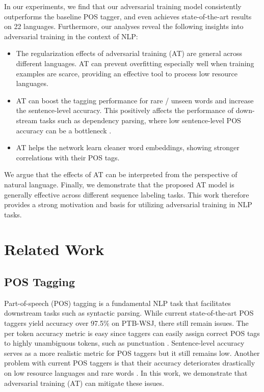 \documentclass[11pt,a4paper]{article}
\begin{document}
In our experiments, we find that our adversarial training model consistently
outperforms the baseline POS tagger, and even achieves state-of-the-art results on 22 languages.
Furthermore,
our analyses reveal the following 
insights into adversarial training in the context of NLP: \vspace{-1mm}

\begin{itemize}[topsep=2mm]
\setlength{\leftskip}{-3mm}
\setlength{\parskip}{0mm}
    \item The regularization effects of  adversarial training (AT) are general across different languages. AT can prevent overfitting especially well when training examples are scarce, providing an effective tool to process low resource languages.

    \item AT can boost the tagging performance for rare \!/\! unseen words and increase the sentence-level accuracy. This positively affects the performance of down-stream tasks such as dependency parsing, where low sentence-level POS accuracy can be a bottleneck \cite{Manning:2011:from97to100}.
    
    \item AT helps the network learn cleaner word embeddings, showing stronger correlations with their POS tags. \vspace{-1mm} 
\end{itemize}
We argue that the effects of AT can be interpreted from the perspective of natural language.
Finally, we demonstrate that the proposed AT model is generally effective across different sequence labeling tasks.
This work therefore provides a strong motivation and basis for utilizing adversarial training in
NLP 
tasks.








\section{Related Work}
\subsection{POS Tagging}

Part-of-speech (POS) tagging is a fundamental NLP task that facilitates downstream tasks such as syntactic parsing.
While current state-of-the-art POS taggers \cite{wang:2015,ma-hovy:2016:P16-1} yield accuracy over 97.5\% on PTB-WSJ, there still remain issues.
The per token accuracy metric is easy since taggers can easily assign correct POS tags to highly unambiguous tokens, such as punctuation \cite{Manning:2011:from97to100}.
Sentence-level accuracy serves as a more realistic metric for POS taggers but it still remains low. 
Another problem with current POS taggers is that their accuracy deteriorates drastically on low resource languages and rare words \cite{plank2016multilingual}.
In this work, we demonstrate that adversarial training (AT) can mitigate these issues.
\end{document}
